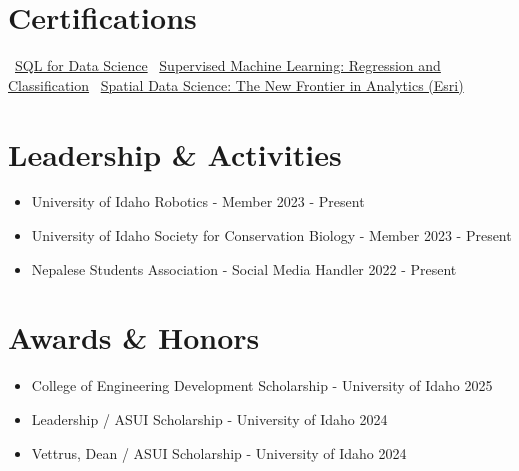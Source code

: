 

\vspace{-10pt}

\section*{Certifications}
\noindent
\textbullet\ \href{https://courses.edx.org/certificates/742e2f851cef479b87f91cfe877c6fce}{SQL for Data Science}
\quad
\textbullet\ \href{https://www.coursera.org/account/accomplishments/verify/VDULR30U389G}{Supervised Machine Learning: Regression and Classification}
\quad
\textbullet\ \href{https://www.esri.com/training/TrainingRecord/Certificate/raun9583_ui_uidaho/66ce66def444ed00bf0a33f9/420}{Spatial Data Science: The New Frontier in Analytics (Esri)}




\vspace{-10pt}

\section*{Leadership \& Activities}
\begin{itemize}[leftmargin=*, labelsep=0.5em, itemsep=2pt]
    \item University of Idaho Robotics - Member \hfill 2023 - Present
    \item University of Idaho Society for Conservation Biology - Member \hfill 2023 - Present
    \item Nepalese Students Association - Social Media Handler \hfill 2022 - Present
\end{itemize}

\vspace{-10pt}

\section*{Awards \& Honors}
\begin{itemize}[leftmargin=*, labelsep=0.5em, itemsep=2pt]
    \item College of Engineering Development Scholarship - University of Idaho \hfill 2025
    \item Leadership / ASUI Scholarship - University of Idaho \hfill 2024
    \item Vettrus, Dean / ASUI Scholarship - University of Idaho \hfill 2024
\end{itemize}





